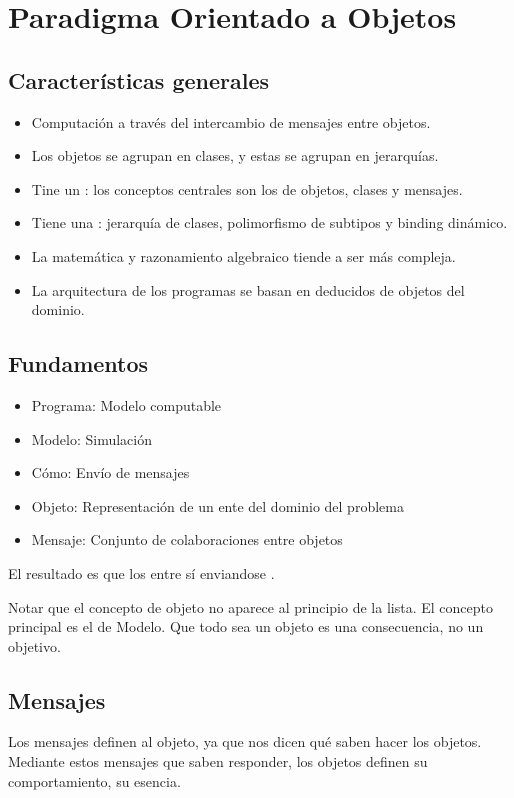 \section{Paradigma Orientado a Objetos}

\subsection{Características generales}

\begin{itemize}
  \item Computación a través del intercambio de mensajes entre objetos.
  \item Los objetos se agrupan en clases, y estas se agrupan en jerarquías.
  \item Tine un : los conceptos centrales son los de objetos, clases y mensajes.
  \item Tiene una : jerarquía de clases, polimorfismo de subtipos y binding dinámico.
  \item La matemática y razonamiento algebraico tiende a ser más compleja.
  \item La arquitectura de los programas se basan en  deducidos de objetos del dominio.
\end{itemize}

\subsection{Fundamentos}

\begin{itemize}
  \item Programa: Modelo computable
  \item Modelo: Simulación
  \item Cómo: Envío de mensajes
  \item Objeto: Representación de un ente del dominio del problema
  \item Mensaje: Conjunto de colaboraciones entre objetos
\end{itemize}

El resultado es que los  entre sí enviandose .

Notar que el concepto de objeto no aparece al principio de la lista. El concepto principal es el de Modelo. Que todo sea un objeto es una consecuencia, no un objetivo.

\subsection{Mensajes}
 Los mensajes definen al objeto, ya que nos dicen qué saben hacer los objetos.
 Mediante estos mensajes que saben responder, los objetos definen su comportamiento, su esencia.

